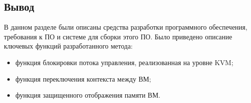 
\subsection*{Вывод}

В данном разделе были описаны средства разработки программного обеспечения, требования к ПО и системе для сборки этого ПО. Было приведено описание ключевых функций разработанного метода:

\begin{itemize}
	\item функция блокировки потока управления, реализованная на уровне KVM;
	\item функция переключения контекста между ВМ;
	\item функция защищенного отображения памяти ВМ.
\end{itemize}

\pagebreak
